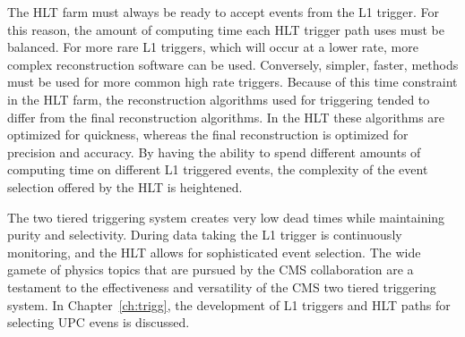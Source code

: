     The HLT farm must always be ready to accept events from the L1 trigger.
    For this reason, the amount of computing time each HLT trigger path uses
      must be balanced.
    For more rare L1 triggers, which will occur at a lower rate, more 
      complex reconstruction software can be used.
    Conversely, simpler, faster, methods must be used for more common high
      rate triggers. 
    Because of this time constraint in the HLT farm, the reconstruction 
      algorithms used for triggering tended to differ from the final 
      reconstruction algorithms.
    In the HLT these algorithms are optimized for quickness, whereas the final 
      reconstruction is optimized for precision and accuracy.
    By having the ability to spend different amounts of computing time on 
      different L1 triggered events, the complexity of the event selection 
      offered by the HLT is heightened. 

    The two tiered triggering system creates very low dead times while 
      maintaining purity and selectivity.
    During data taking the L1 trigger is continuously monitoring, and the HLT
      allows for sophisticated event selection.
    The wide gamete of physics topics that are pursued by the CMS collaboration
      are a testament to the effectiveness and versatility of the CMS two 
      tiered triggering system.
    In Chapter~\ref{ch:trigg}, the development of L1 triggers and HLT paths 
      for selecting UPC evens is discussed. 
